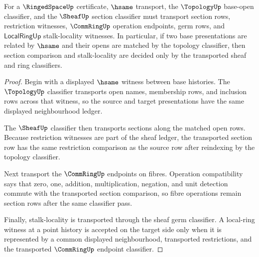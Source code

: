 \begin{theorem}\label{thm:ringedspace-classifier-transport-obligation}
For a $\RingedSpaceUp$ certificate, $\hsame$ transport, the $\TopologyUp$ base-open classifier, and the $\SheafUp$ section classifier must transport section rows, restriction witnesses, $\CommRingUp$ operation endpoints, germ rows, and $\mathsf{LocalRingUp}$ stalk-locality witnesses. In particular, if two base presentations are related by $\hsame$ and their opens are matched by the topology classifier, then section comparison and stalk-locality are decided only by the transported sheaf and ring classifiers.
\end{theorem}
\begin{proof}
Begin with a displayed $\hsame$ witness between base histories. The $\TopologyUp$ classifier transports open names, membership rows, and inclusion rows across that witness, so the source and target presentations have the same displayed neighbourhood ledger.

The $\SheafUp$ classifier then transports sections along the matched open rows. Because restriction witnesses are part of the sheaf ledger, the transported section row has the same restriction comparison as the source row after reindexing by the topology classifier.

Next transport the $\CommRingUp$ endpoints on fibres. Operation compatibility says that zero, one, addition, multiplication, negation, and unit detection commute with the transported section comparison, so fibre operations remain section rows after the same classifier pass.

Finally, stalk-locality is transported through the sheaf germ classifier. A local-ring witness at a point history is accepted on the target side only when it is represented by a common displayed neighbourhood, transported restrictions, and the transported $\CommRingUp$ endpoint classifier.
\end{proof}

